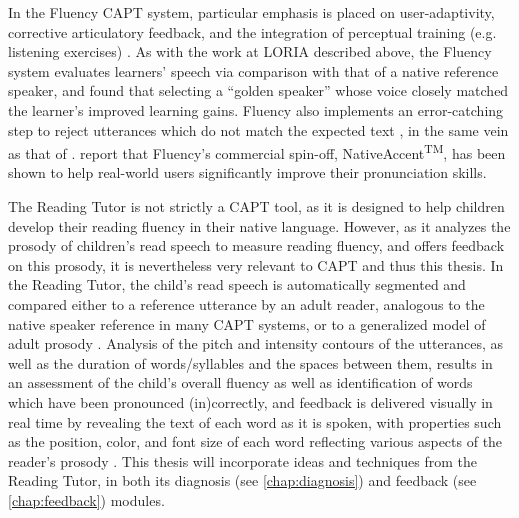 	In the Fluency CAPT system, particular emphasis is placed on
user-adaptivity, corrective articulatory feedback, and the integration of perceptual training (e.g. listening exercises) \citep{Eskenazi2000}. As with the work at LORIA described above, the Fluency system evaluates learners' speech via comparison with that of a native reference speaker, and \textcite{Probst2002} found that selecting a ``golden speaker'' whose voice closely matched the learner's improved learning gains. Fluency also implements an error-catching step to reject utterances which do not match the expected text \citep{Eskenazi2000}, in the same vein as that of \textcite{Mesbahi2011,Orosanu2012}. \textcite{Eskenazi2007} report that Fluency's commercial spin-off, NativeAccent\textsuperscript{TM}, has been shown to help real-world users significantly improve their pronunciation skills.
	
	The Reading Tutor is not strictly a CAPT tool, as it is designed to help children develop their reading fluency in their native language. However, as it analyzes the prosody of children's read speech to measure reading fluency, and offers feedback on this prosody, it is nevertheless very relevant to CAPT and thus this thesis. 
	In the Reading Tutor, the child's read speech is automatically segmented and compared either to a reference utterance by an adult reader, analogous to the native speaker reference in many CAPT systems, or to a generalized model of adult prosody \citep{Duong2011}. Analysis of the pitch and intensity contours of the utterances, as well as the duration of words/syllables and the spaces between them, results in an assessment of the child's overall fluency as well as identification of words which have been pronounced (in)correctly, and feedback is delivered visually in real time by revealing the text of each word as it is spoken, with properties such as the position, color, and font size of each word reflecting various aspects of the reader's prosody \citep{Sitaram2011}. This thesis will incorporate ideas and techniques from the Reading Tutor, in both its diagnosis (see \cref{chap:diagnosis}) and feedback (see \cref{chap:feedback}) modules. %
	
